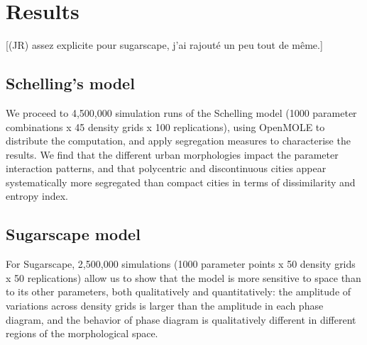 \documentclass[Afour,sageh,times]{sagej}
\begin{document}
\section{Results}

[(JR) assez explicite pour sugarscape, j'ai rajouté un peu tout de même.]



\subsection{Schelling's model}

We proceed to 4,500,000 simulation runs of the Schelling model (1000 parameter combinations x 45 density grids x 100 replications), using OpenMOLE to distribute the computation, and apply segregation measures to characterise the results. We find that the different urban morphologies impact the parameter interaction patterns, and that polycentric and discontinuous cities appear systematically more segregated than compact cities in terms of dissimilarity and entropy index.



\subsection{Sugarscape model}

For Sugarscape, 2,500,000 simulations (1000 parameter points x 50 density grids x 50 replications) allow us to show that the model is more sensitive to space than to its other parameters, both qualitatively and quantitatively: the amplitude of variations across density grids is larger than the amplitude in each phase diagram, and the behavior of phase diagram is qualitatively different in different regions of the morphological space.
\end{document}
